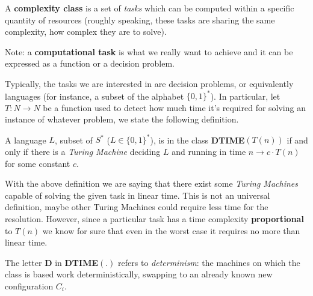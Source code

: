 A \textbf{complexity class} is a set of \textit{tasks} which can be computed within a specific quantity of resources (roughly speaking, these tasks are sharing
the same complexity, how complex they are to solve). \vspace{3.5pt}

Note: a \textbf{computational task} is what we really want to achieve and it can be expressed as a function or a decision problem. \vspace{3.5pt}

Typically, the tasks we are interested in are decision problems, or equivalently languages (for instance, a subset of the alphabet $\{0,1\}^*$). In particular,
let $T: N \rightarrow N$ be a function used to detect how much time it's required for solving an instance of whatever problem, we state the following definition.
\begin{definition}
    A language $L$, subset of $S^*$ ($L \in \{0,1\}^*$), is in the class \textbf{DTIME}$(T(n))$ if and only if there is a \textit{Turing Machine} deciding $L$
    and running in time $n \rightarrow c \cdot T(n)$ for some constant $c$.
\end{definition} 
With the above definition we are saying that there exist some \textit{Turing Machines} capable of solving the given task in linear time. This is not an universal
definition, maybe other Turing Machines could require less time for the resolution. However, since a particular task has a time complexity 
\textbf{proportional} to $T(n)$ we know for sure that even in the worst case it requires no more than linear time. \vspace{3.5pt}

The letter \textbf{D} in \textbf{DTIME}$(.)$ refers to \textit{determinism}: the machines on which the class is based work deterministically, swapping to an 
already known new configuration $C_i$.